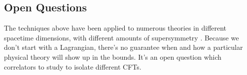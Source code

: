 \documentclass{ws-rv9x6}
\newcommand\<\langle
\renewcommand\>\rangle
\renewcommand\.{\cdot}
\begin{document}
\subsection{Open Questions}

The techniques above have been applied to numerous theories in different spacetime dimensions, with different amounts of supersymmetry \cite{Rattazzi:2008pe, Rychkov:2009ij, Caracciolo:2009bx, Poland:2010wg, Rattazzi:2010gj, Rattazzi:2010yc, Vichi:2011ux, Poland:2011ey, Rychkov:2011et, ElShowk:2012ht,Liendo:2012hy, Beem:2013qxa, Kos:2013tga, El-Showk:2013nia, Alday:2013opa, Gaiotto:2013nva,Bashkirov:2013vya, Berkooz:2014yda, El-Showk:2014dwa, Nakayama:2014lva,Nakayama:2014yia, Alday:2014qfa, Chester:2014fya, Kos:2014bka, Caracciolo:2014cxa, Nakayama:2014sba, Golden:2014oqa, Chester:2014mea, Paulos:2014vya, Beem:2014zpa, Simmons-Duffin:2015qma, Bobev:2015vsa, Bobev:2015jxa, Kos:2015mba, Chester:2015qca, Beem:2015aoa, Iliesiu:2015qra,poland2015exploring,Lemos:2015awa,Lin:2015wcg,Chester:2015lej,Chester:2016wrc}.  Because we don't start with a Lagrangian, there's no guarantee when and how a particular physical theory will show up in the bounds. It's an open question which correlators to study to isolate different CFTs.
\end{document}
